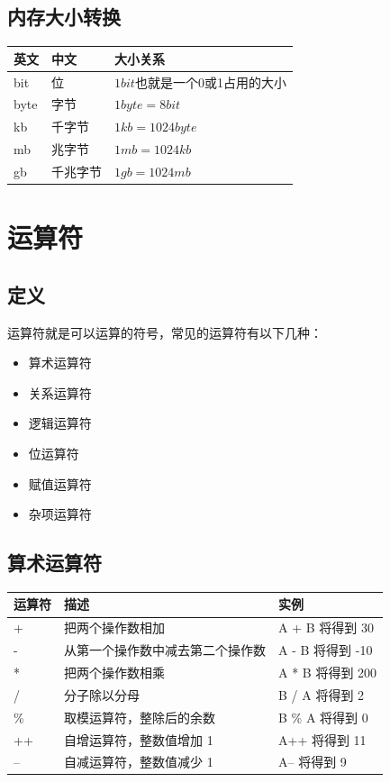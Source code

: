 \documentclass[
  paper=a4,
  ,captions=tableheading
]{scrbook}
\providecommand{\tightlist}{%
  \setlength{\itemsep}{0pt}\setlength{\parskip}{0pt}}
\begin{document}
\hypertarget{ux5185ux5b58ux5927ux5c0fux8f6cux6362}{%
\subsection{内存大小转换}\label{ux5185ux5b58ux5927ux5c0fux8f6cux6362}}

\begin{longtable}[]{@{}lll@{}}
\toprule
英文 & 中文 & 大小关系 \\
\midrule
\endhead
bit & 位 & \(1 bit\)也就是一个0或1占用的大小 \\
byte & 字节 & \(1 byte = 8 bit\) \\
kb & 千字节 & \(1 kb = 1024 byte\) \\
mb & 兆字节 & \(1 mb = 1024 kb\) \\
gb & 千兆字节 & \(1 gb = 1024 mb\) \\
\bottomrule
\end{longtable}

\hypertarget{ux8fd0ux7b97ux7b26}{%
\section{运算符}\label{ux8fd0ux7b97ux7b26}}

\hypertarget{ux5b9aux4e49}{%
\subsection{定义}\label{ux5b9aux4e49}}

运算符就是可以运算的符号，常见的运算符有以下几种：

\begin{itemize}
\tightlist
\item
  算术运算符
\item
  关系运算符
\item
  逻辑运算符
\item
  位运算符
\item
  赋值运算符
\item
  杂项运算符
\end{itemize}

\hypertarget{ux7b97ux672fux8fd0ux7b97ux7b26}{%
\subsection{算术运算符}\label{ux7b97ux672fux8fd0ux7b97ux7b26}}

\begin{longtable}[]{@{}lll@{}}
\toprule
运算符 & 描述 & 实例 \\
\midrule
\endhead
+ & 把两个操作数相加 & A + B 将得到 30 \\
- & 从第一个操作数中减去第二个操作数 & A - B 将得到 -10 \\
* & 把两个操作数相乘 & A * B 将得到 200 \\
/ & 分子除以分母 & B / A 将得到 2 \\
\% & 取模运算符，整除后的余数 & B \% A 将得到 0 \\
++ & 自增运算符，整数值增加 1 & A++ 将得到 11 \\
-- & 自减运算符，整数值减少 1 & A-- 将得到 9 \\
\bottomrule
\end{longtable}
\end{document}
